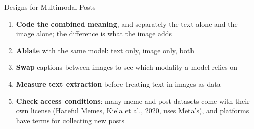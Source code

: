\begin{frame}{Designs for Multimodal Posts}
\begin{enumerate}
\setlength{\itemsep}{4pt}
\item \textbf{Code the combined meaning}, and separately the text alone and the image alone; the
      difference is what the image adds
\item \textbf{Ablate} with the same model: text only, image only, both
\item \textbf{Swap} captions between images to see which modality a model relies on
\item \textbf{Measure text extraction} before treating text in images as data
\item \textbf{Check access conditions}: many meme and post datasets come with their own license
      (Hateful Memes, Kiela et al., 2020, uses Meta's), and platforms have terms for collecting new
      posts
\end{enumerate}
\end{frame}



